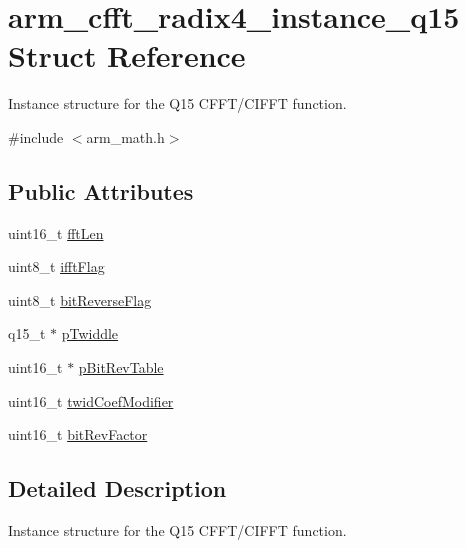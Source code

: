 \hypertarget{structarm__cfft__radix4__instance__q15}{\section{arm\-\_\-cfft\-\_\-radix4\-\_\-instance\-\_\-q15 Struct Reference}
\label{structarm__cfft__radix4__instance__q15}
}


Instance structure for the Q15 C\-F\-F\-T/\-C\-I\-F\-F\-T function.  




{\ttfamily \#include $<$arm\-\_\-math.\-h$>$}

\subsection*{Public Attributes}
\begin{DoxyCompactItemize}
\item 
uint16\-\_\-t \hyperlink{structarm__cfft__radix4__instance__q15_a5fc543e7d84ca8cb7cf6648970f21ca6}{fft\-Len}
\item 
uint8\-\_\-t \hyperlink{structarm__cfft__radix4__instance__q15_a2ecff6ea735cb4d22e922d0fd5736655}{ifft\-Flag}
\item 
uint8\-\_\-t \hyperlink{structarm__cfft__radix4__instance__q15_a101e3f7b0bd6b5b14cd5214f23df4133}{bit\-Reverse\-Flag}
\item 
q15\-\_\-t $\ast$ \hyperlink{structarm__cfft__radix4__instance__q15_a29dd693537e45421a36891f8439e1fba}{p\-Twiddle}
\item 
uint16\-\_\-t $\ast$ \hyperlink{structarm__cfft__radix4__instance__q15_a4acf704ae0cf30b53bf0fbfae8e34a59}{p\-Bit\-Rev\-Table}
\item 
uint16\-\_\-t \hyperlink{structarm__cfft__radix4__instance__q15_af32fdc78bcc27ca385f9b76a0a1f71c3}{twid\-Coef\-Modifier}
\item 
uint16\-\_\-t \hyperlink{structarm__cfft__radix4__instance__q15_a6b010e5f02d1130c621e3d2e26b95df1}{bit\-Rev\-Factor}
\end{DoxyCompactItemize}


\subsection{Detailed Description}
Instance structure for the Q15 C\-F\-F\-T/\-C\-I\-F\-F\-T function. 


